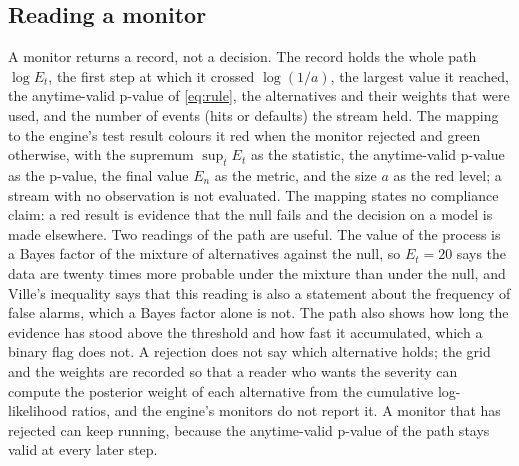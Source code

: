 \subsection{Reading a monitor}
\label{sec:method-reading}

A monitor returns a record, not a decision. The record holds the whole path $\log E_t$, the first step at which it crossed $\log(1/a)$, the largest value it reached, the anytime-valid p-value of \cref{eq:rule}, the alternatives and their weights that were used, and the number of events (hits or defaults) the stream held. The mapping to the engine's test result colours it red when the monitor rejected and
green otherwise, with the supremum $\sup_tE_t$ as the statistic, the anytime-valid p-value as the p-value, the final value $E_n$ as the metric, and the size $a$ as the red level; a stream with no observation is not evaluated. The mapping states no compliance claim: a red result is evidence that the null fails and the decision on a model is made elsewhere.
Two readings of the path are useful. The value of the process is a Bayes factor of the mixture of alternatives against the null, so $E_t=20$ says the data are twenty times more probable under the mixture than under the null, and Ville's inequality says that this reading is also a statement about the frequency of false alarms, which a Bayes factor alone is not. The path also shows how long the evidence has stood above the threshold and how fast it
accumulated, which a binary flag does not. A rejection does not say which alternative holds; the grid and the weights are recorded so that a reader who wants the severity can compute the posterior weight of each alternative from the cumulative log-likelihood ratios, and the engine's monitors do not report it. A monitor that has rejected can keep running, because the anytime-valid p-value of the path stays valid at every later step.

